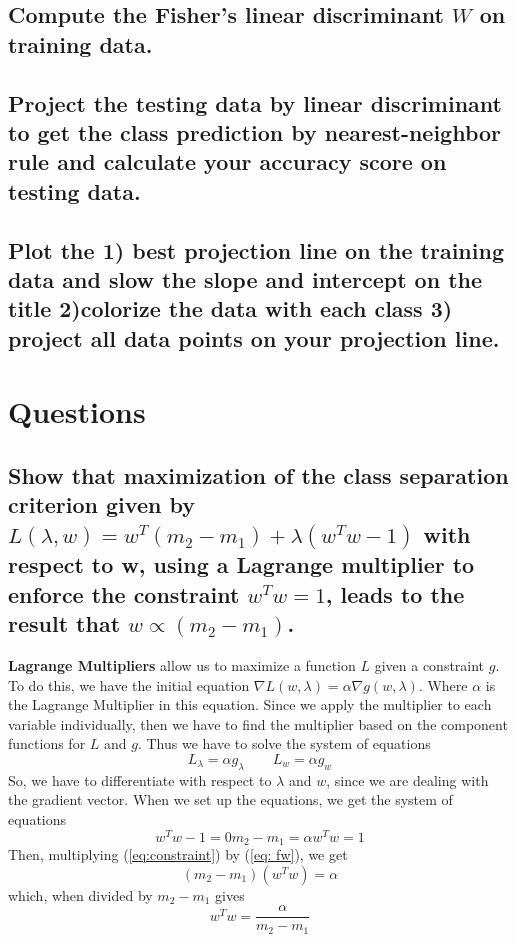 \documentclass{article}
\begin{document}
	\subsection{Compute the Fisher's linear discriminant $W$ on training data.}
	\subsection{Project the testing data by linear discriminant to get the class prediction by
		nearest-neighbor rule and calculate your accuracy score on testing data.}
	\subsection{Plot the \textbf{1) best projection line} on the training data and slow the slope
		and intercept on the title \textbf{2)colorize the data} with each class \textbf{3) project
		all data points on your projection line}.}
\section{Questions}
	\subsection{Show that maximization of the class separation criterion given by 
		$L(\lambda, w) = w^{T}(m_{2} - m_{1})  + \lambda(w^{T}w - 1)$ with respect to w, using a
		Lagrange multiplier to enforce the constraint $w^{T}w = 1$, leads to the result that 
		$w \propto (m_{2} - m_{1})$.}

		\textbf{Lagrange Multipliers} allow us to maximize a function $L$ given a constraint $g$.
		To do this, we have  the initial equation $\nabla L(w, \lambda) = \alpha \nabla g(w, \lambda)$. Where 
		$\alpha$ is the Lagrange Multiplier in this equation. Since we apply the multiplier to each
		variable individually, then we have to find the multiplier based on the component functions 
		for $L$ and $g$. Thus we have to solve the system of equations 
		\[ L_{\lambda} = \alpha g_{\lambda} \quad\quad L_{w} = \alpha g_{w} \]
		So, we have to differentiate with respect to $\lambda$ and $w$, since we are dealing with the gradient
		vector. When we set up the equations, we get the system of equations
		\begin{subequations}
			\begin{equation}
				w^{T}w -1 = 0
			\end{equation}
			\begin{equation}
				\label{eq: fw}
				m_{2} - m_{1} = \alpha
			\end{equation}
			\begin{equation}
				\label{eq:constraint}
				w^{T}w = 1
			\end{equation}
		\end{subequations}
		Then, multiplying (\ref{eq:constraint}) by (\ref{eq: fw}), we get
		\[(m_{2} - m_{1})(w^{T}w) = \alpha\]
		which, when divided by $m_{2} - m_{1}$ gives 
		\[w^{T}w = \frac{\alpha}{m_{2} - m_{1}}\]
\end{document}
